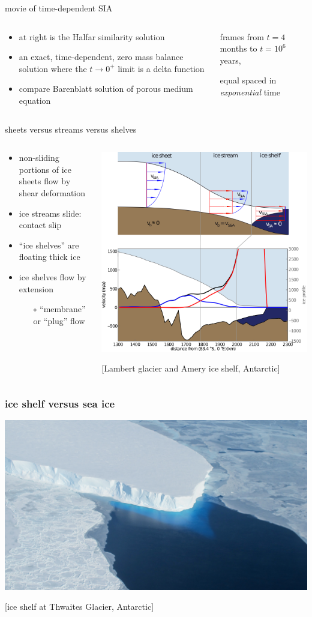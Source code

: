 \documentclass[hide notes,intlimits]{beamer}
\newcommand{\contactslipslide}{
\begin{frame}{sheets versus streams versus shelves}

\begin{columns}
\begin{column}{0.35\textwidth}
\small
\begin{itemize}
\small
\item non-sliding portions of ice sheets flow by shear deformation
\item ice streams slide: \alert{contact slip}
\item ``ice shelves'' are floating thick ice
\item ice shelves flow by extension
  \begin{itemize}
  \scriptsize
  \item[$\circ$] ``membrane'' or ``plug'' flow
  \end{itemize}
\end{itemize}
\end{column}

\begin{column}{0.65\textwidth}
\includegraphics[width=1.1\textwidth]{siassacartoon-lambert}

\begin{center}
\vspace{-0.18in}
\tiny [Lambert glacier and Amery ice shelf, Antarctic]
\end{center}
\end{column}
\end{columns}
\end{frame}
}
\begin{document}
\begin{frame}{movie of time-dependent SIA}

\begin{columns}
\begin{column}{0.4\textwidth}
\small
\begin{itemize}
\item at right is the Halfar similarity solution
\item an exact, time-dependent, zero mass balance solution where the $t\to 0^+$ limit is a delta function
\item compare Barenblatt solution of porous medium equation
\end{itemize}
\end{column}

\begin{column}{0.65\textwidth}
\vspace{-0.25in}

\begin{center}

\bigskip
\tiny
frames from $t=4$ months to $t = 10^6$ years,

equal spaced in \emph{exponential} time
\end{center}
\end{column}
\end{columns}
\end{frame}


\contactslipslide


\begin{frame}
  \frametitle{ice shelf versus sea ice}

\begin{center}
\vspace{-0.2in}

\includegraphics[width=1.0\textwidth]{supp4rignot-small}

\medskip
\tiny [ice shelf at Thwaites Glacier, Antarctic]
\end{center}
\end{frame}
\end{document}
